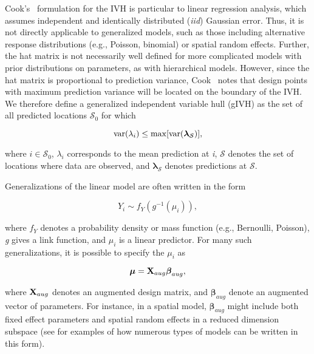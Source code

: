 \documentclass[10pt,letterpaper]{article}
\begin{document}
Cook's~\cite{Cook1979} formulation for the IVH is particular to linear regression analysis, which assumes independent and identically distributed (\textit{iid}) Gaussian error. Thus, it is not directly applicable to generalized models, such as those including alternative response distributions (e.g., Poisson, binomial) or spatial random effects.  Further, the hat matrix is not necessarily well defined for more complicated models with prior distributions on parameters, as with hierarchical models. However, since the hat matrix is proportional to prediction variance, Cook~\cite{Cook1979} notes that design points with maximum prediction variance will be located on the boundary of the IVH.  We therefore define a generalized independent variable hull (gIVH) as the set of all predicted locations $\mathcal{S}_0$ for which
\begin{linenomath*}
\begin{equation}
  \label{eq:gIVH}
  {\rm var}(\lambda_i) \le {\rm max} [{\rm var}(\boldsymbol{\lambda}_{\mathcal{S}})],
\end{equation}
\end{linenomath*}
where $i \in \mathcal{S}_0$, $\lambda_i$ corresponds to the mean prediction at \textit{i}, $\mathcal{S}$ denotes the set of locations where data are observed, and $\boldsymbol{\lambda}_\mathcal{S}$ denotes predictions at $\mathcal{S}$.

Generalizations of the linear model are often written in the form
\begin{linenomath*}
\begin{equation}
  Y_i \sim f_Y(g^{-1}(\mu_i)),
  \label{eq:Y}
\end{equation}
\end{linenomath*}
where $f_Y$ denotes a probability density or mass function (e.g., Bernoulli, Poisson), \textit{g} gives a link function, and
$\mu_i$ is a linear predictor.  For many such generalizations, it is possible to specify the $\mu_i$ as
\begin{linenomath*}
\begin{equation}
  \boldsymbol{\mu} = {\bf X}_{aug}\boldsymbol{\beta}_{aug},
  \label{eq:mu-aug}
\end{equation}
\end{linenomath*}
where ${\bf X}_{aug}$ denotes an augmented design matrix, and $\boldsymbol{\beta}_{aug}$ denote an augmented vector of parameters.  For instance, in a spatial model, $\boldsymbol{\beta}_{aug}$ might include both fixed effect parameters and spatial random effects in a reduced dimension subspace (see  for examples of how numerous types of models can be written in this form).
\end{document}
